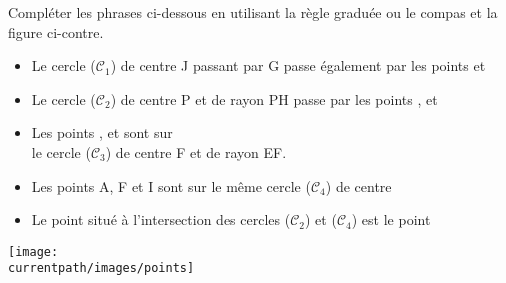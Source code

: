 \begin{exercice*}
  Compléter les phrases ci-dessous en utilisant la règle graduée ou le compas et la figure ci-contre.
  \begin{itemize}
     \item Le cercle ($\mathcal{C}_1$) de centre J passant par G passe également par les points \makebox[0.15\linewidth]{\dotfill} et  \makebox[0.15\linewidth]{\dotfill} \\ [-5mm]
     \item Le cercle ($\mathcal{C}_2$) de centre P et de rayon PH passe par les points  \makebox[0.15\linewidth]{\dotfill},  \makebox[0.15\linewidth]{\dotfill} et  \makebox[0.15\linewidth]{\dotfill}
     \item Les points  \makebox[0.15\linewidth]{\dotfill},  \makebox[0.15\linewidth]{\dotfill} et  \makebox[0.15\linewidth]{\dotfill} sont sur \\
        le cercle ($\mathcal{C}_3$) de centre F et de rayon EF.
     \item Les points A, F et I sont sur le même cercle ($\mathcal{C}_4$) de centre  \makebox[0.3\linewidth]{\dotfill}
     \item Le point situé à l'intersection des cercles ($\mathcal{C}_2$) et ($\mathcal{C}_4$) est le point  \makebox[0.3\linewidth]{\dotfill}
  \end{itemize}
  \begin{center}
     \texttt{[image: \\currentpath/images/points]}
  \end{center}
\end{exercice*} 
